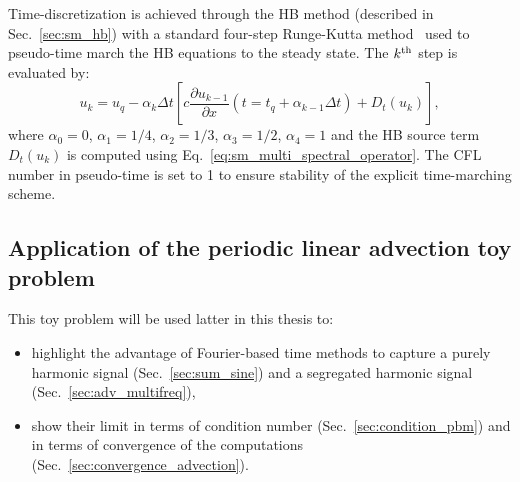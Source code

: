 Time-discretization is achieved 
through the HB method (described in Sec.~\ref{sec:sm_hb})
with a standard four-step Runge-Kutta method~\cite{Jameson1981}
used to pseudo-time 
march the HB equations to the steady state.
The $k\textsuperscript{th}$ step is evaluated by:
\begin{equation}
    u_k = u_q - \alpha_k \Delta t \left [ 
          c \frac{\partial u_{k-1}}{\partial x} (t=t_q + \alpha_{k-1} \Delta t)
          + D_t(u_k)
          \right],
    \label{eq:convection_rk4}
\end{equation}
where $\alpha_0 = 0$, $\alpha_1 = 1/4$, 
$\alpha_2 = 1/3$, $\alpha_3 = 1/2$, $\alpha_4 = 1$ and 
the HB source term $D_t(u_k)$ is computed using Eq.~\eqref{eq:sm_multi_spectral_operator}.
The CFL number in pseudo-time is set to 1 
to ensure stability of the explicit time-marching scheme.

\subsection{Application of the periodic linear advection toy problem}

This toy problem will be used latter in this thesis to:
\begin{itemize} \itemsep0pt \parskip0pt
  \item highlight the advantage of Fourier-based time methods to capture
  a purely harmonic
  signal (Sec.~\ref{sec:sum_sine}) and a segregated harmonic signal
  (Sec.~\ref{sec:adv_multifreq}),
  \item show their limit in terms of condition number (Sec.~\ref{sec:condition_pbm})
  and in terms of convergence of the computations (Sec.~\ref{sec:convergence_advection}).
\end{itemize}
